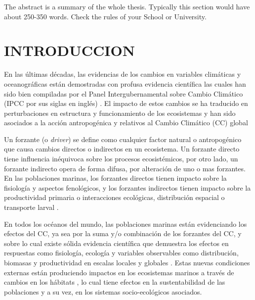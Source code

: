 \documentclass{sydneythesis}
\begin{document}
The abstract is a summary of the whole thesis. Typically this section would have about 250-350 words. Check the rules of your School or University.

\clearpage{}\setcounter{page}{0}

\hypertarget{ch:intro}{%
\chapter{INTRODUCCION}\label{ch:intro}}

\quad

En las últimas décadas, las evidencias de los cambios en variables climáticas y oceanográficas están demostradas con profusa evidencia científica las cuales han sido bien compiladas por el Panel Intergubernamental sobre Cambio Climático (IPCC por sus siglas en inglés) \autocite{IPCC2014}. El impacto de estos cambios se ha traducido en perturbaciones en estructura y funcionamiento de los ecosistemas y han sido asociados a la acción antropogénica \autocite{Marshall2018} \autocite{Worm2012} y relativos al Cambio Climático (CC) global \autocite{Bryndum-Buchholz2019,Rijnsdorp2009} \autocite{Arana2020b,Arcos2004,Worm2012}

Un forzante (o \emph{driver}) se define como cualquier factor natural o antropogénico que causa cambios directos o indirectos en un ecosistema. Un forzante directo tiene influencia inéquivoca sobre los procesos ecosistémicos, por otro lado, un forzante indirecto opera de forma difusa, por alteración de uno o mas forzantes. En las poblaciones marinas, los forzantes directos tienen impacto sobre la fisiología y aspectos fenológicos, y los forzantes indirectos tienen impacto sobre la productividad primaria o interacciones ecológicas, distribución espacial o transporte larval \autocite{Koenigstein2016}.

En todos los océanos del mundo, las poblaciones marinas están evidenciando los efectos del CC, ya sea por la suma y/o combinación de los forzantes del CC, y sobre lo cual existe sólida evidencia científica que demuestra los efectos en respuestas como fisiología, ecología y variables observables como distribución, biomasas y productividad en escalas locales y globales \autocite{Barange2014,Bryndum-Buchholz2019,Perry2005,Rijnsdorp2009}. Estas nuevas condiciones externas están produciendo impactos en los ecosistemas marinos a través de cambios en los hábitats \autocite{Bryndum-Buchholz2019,Shoji2011,Rijnsdorp2009,Hidalgo2018}, lo cual tiene efectos en la sustentabilidad de las poblaciones y a su vez, en los sistemas socio-ecológicos asociados.
\end{document}
